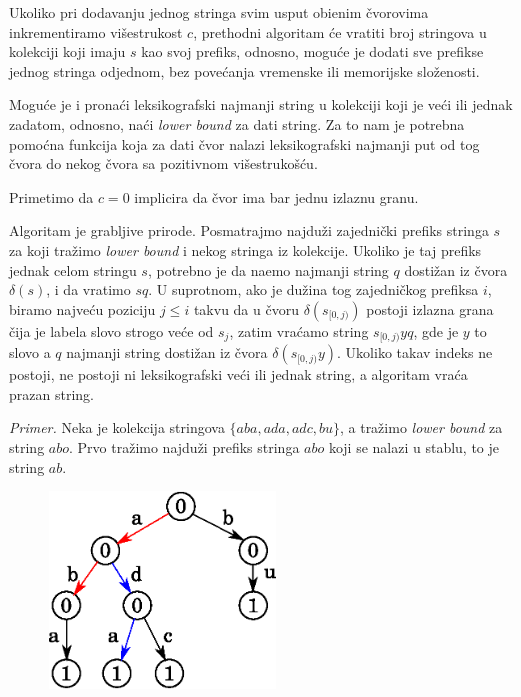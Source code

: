 Ukoliko pri dodavanju jednog stringa svim usput obi\dj enim \v cvorovima inkrementiramo vi\v sestrukost $c$, prethodni algoritam \' ce vratiti broj stringova u kolekciji koji imaju $s$ kao svoj prefiks, odnosno, mogu\' ce je dodati sve prefikse jednog stringa odjednom, bez pove\' canja vremenske ili memorijske slo\v zenosti.

Mogu\' ce je i prona\' ci leksikografski najmanji string u kolekciji koji je ve\' ci ili jednak zadatom, odnosno, na\' ci \textit{lower bound} za dati string. Za to nam je potrebna pomo\' cna funkcija koja za dati \v cvor nalazi leksikografski najmanji put od tog \v cvora do nekog \v cvora sa pozitivnom vi\v sestruko\v s\' cu. 



Primetimo da $c=0$ implicira da \v cvor ima bar jednu izlaznu granu.

\noindent
\begin{minipage}[l]{\textwidth}

\end{minipage}

Algoritam je grabljive prirode. Posmatrajmo najdu\v zi zajedni\v cki prefiks stringa $s$ za koji tra\v zimo \textit{lower bound} i nekog stringa iz kolekcije. Ukoliko je taj prefiks jednak celom stringu $s$, potrebno je da na\dj emo najmanji string $q$ dosti\v zan iz \v cvora $\delta(s)$, i da vratimo $sq$. U suprotnom, ako je du\v zina tog zajedni\v ckog prefiksa $i$, biramo najve\' cu poziciju $j \leq i$ takvu da u \v cvoru $\delta(s_{[0, j)})$ postoji izlazna grana \v cija je labela slovo strogo ve\' ce od $s_j$, zatim vra\' camo string $s_{[0,j)}yq$, gde je $y$ to slovo a $q$ najmanji string dosti\v zan iz \v cvora $\delta(s_{[0,j)}y)$. Ukoliko takav indeks ne postoji, ne postoji ni leksikografski ve\' ci ili jednak string, a algoritam vra\' ca prazan string.

\textit{Primer.} Neka je kolekcija stringova $\{aba, ada, adc, bu\}$, a tra\v zimo \textit{lower bound} za string $abo$. Prvo tra\v zimo najdu\v zi prefiks stringa $abo$ koji se nalazi u stablu, to je string $ab$.

\begin{figure}[H]
    \centering
    \includegraphics[width=60mm]{../img/trielb1.eps}
\end{figure}

